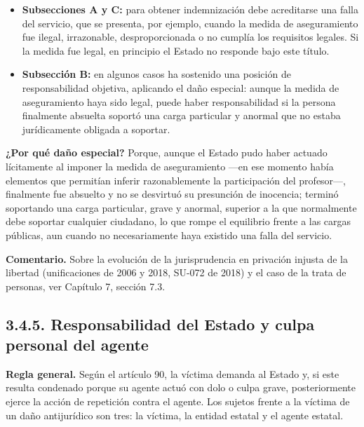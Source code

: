 \begin{itemize}
\item \textbf{Subsecciones A y C:} para obtener indemnización debe acreditarse una falla del servicio, que se presenta, por ejemplo, cuando la medida de aseguramiento fue ilegal, irrazonable, desproporcionada o no cumplía los requisitos legales. Si la medida fue legal, en principio el Estado no responde bajo este título.
\item \textbf{Subsección B:} en algunos casos ha sostenido una posición de responsabilidad objetiva, aplicando el daño especial: aunque la medida de aseguramiento haya sido legal, puede haber responsabilidad si la persona finalmente absuelta soportó una carga particular y anormal que no estaba jurídicamente obligada a soportar.
\end{itemize}
\textbf{¿Por qué daño especial?} Porque, aunque el Estado pudo haber actuado lícitamente al imponer la medida de aseguramiento —en ese momento había elementos que permitían inferir razonablemente la participación del profesor—, finalmente fue absuelto y no se desvirtuó su presunción de inocencia; terminó soportando una carga particular, grave y anormal, superior a la que normalmente debe soportar cualquier ciudadano, lo que rompe el equilibrio frente a las cargas públicas, aun cuando no necesariamente haya existido una falla del servicio.

\begin{comentario}
\textcolor[HTML]{8A6D3B}{\textbf{Comentario. }}Sobre la evolución de la jurisprudencia en privación injusta de la libertad (unificaciones de 2006 y 2018, SU-072 de 2018) y el caso de la trata de personas, ver Capítulo 7, sección 7.3.
\end{comentario}
\subsection{3.4.5. Responsabilidad del Estado y culpa personal del agente}
\textbf{Regla general.} Según el artículo 90, la víctima demanda al Estado y, si este resulta condenado porque su agente actuó con dolo o culpa grave, posteriormente ejerce la acción de repetición contra el agente. Los sujetos frente a la víctima de un daño antijurídico son tres: la víctima, la entidad estatal y el agente estatal.

